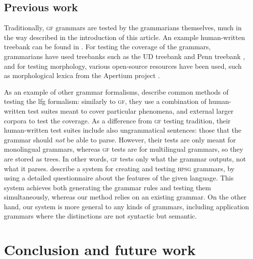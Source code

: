 \documentclass[11pt]{article}
\def\gf{\textsc{gf}}
\def\hpsg{\textsc{hpsg}}
\newcommand{\todo}[1]{{\color{cyan}\textbf{[TODO: }#1\textbf{]}}}
\begin{document}

\subsection{Previous work}

Traditionally, \gf{} grammars are tested by the grammarians themselves,
much in the way described in the introduction of this article. An example
human-written treebank can be found in \cite[p.~136--142]{khegai2006phd}.
For testing the coverage of the grammars, grammarians have used
treebanks such as the UD treebank \cite{nivre2016ud} and Penn treebank
\cite{marcus1993penntreebank}, and for testing morphology, various open-source resources
have been used, such as morphological lexica from the Apertium
project \cite{forcada2011apertium}.



As an example of other grammar formalisms,
\cite[pp.~212--213]{butt1999lfg} describe common methods of testing
the {\sc lfg} formalism: similarly to \gf, they use a combination of
human-written test suites meant to cover particular phenomena, and
external larger corpora to test the coverage. As a difference from \gf{}
testing tradition, their human-written test suites include also
ungrammatical sentences: those that the grammar should \emph{not} be
able to parse. However, their tests are only meant for monolingual
grammars, whereas \gf{} tests are for multilingual grammars, so they are
stored as trees. In other words, \gf{} tests only what the grammar
outputs, not what it parses.
\cite{bender2010} describe a system for creating and testing \hpsg{} \cite{pollard1994hpsg}
grammars, by using a detailed questionnaire about the features of the
given language. This system achieves both generating the grammar rules
and testing them simultaneously, whereas our method relies on an
existing grammar. On the other hand, our system is more general to any
kinds of grammars, including application grammars where the
distinctions are not syntactic but semantic.




\section{Conclusion and future work}
\end{document}
